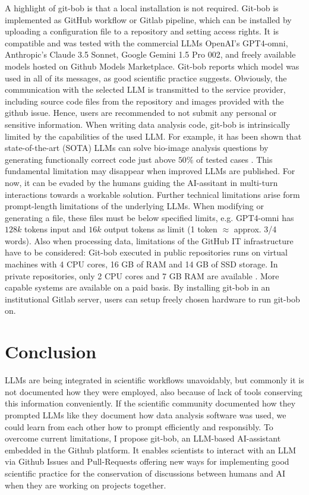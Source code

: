 \documentclass[times, twoside]{zHenriquesLab-StyleBioRxiv}
\begin{document}
A highlight of git-bob is that a local installation is not required. Git-bob is implemented as GitHub workflow or Gitlab pipeline, which can be installed by uploading a configuration file to a repository and setting access rights. It is compatible and was tested with the commercial LLMs OpenAI's GPT4-omni, Anthropic's Claude 3.5 Sonnet, Google Gemini 1.5 Pro 002, and freely available models hosted on Github Models Marketplace. Git-bob reports which model was used in all of its messages, as good scientific practice suggests. Obviously, the communication with the selected LLM is transmitted to the service provider, including source code files from the repository and images provided with the github issue. Hence, users are recommended to not submit any personal or sensitive information. When writing data analysis code, git-bob is intrinsically limited by the capabilities of the used LLM. For example, it has been shown that state-of-the-art (SOTA) LLMs can solve bio-image analysis questions by generating functionally correct code just above $50\%$ of tested cases \cite{benchmark_llm_bia}. This fundamental limitation may disappear when improved LLMs are published. For now, it can be evaded by the humans guiding the AI-assitant in multi-turn interactions towards a workable solution. Further technical limitations arise form prompt-length limitations of the underlying LLMs. When modifying or generating a file, these files must be below specified limits, e.g. GPT4-omni has $128k$ tokens input and $16k$ output tokens as limit (1 token $\approx$ approx. 3/4 words). Also when processing data, limitations of the GitHub IT infrastructure have to be considered: Git-bob executed in public repositories runs on virtual machines with 4 CPU cores, 16 GB of RAM and 14 GB of SSD storage. In private repositories, only 2 CPU cores and 7 GB RAM are available \cite{github_actions_runners_2024}. More capable systems are available on a paid basis. By installing git-bob in an institutional Gitlab server, users can setup freely chosen hardware to run git-bob on.


\section*{Conclusion}

LLMs are being integrated in scientific workflows unavoidably, but commonly it is not documented how they were employed, also because of lack of tools conserving this information conveniently. If the scientific community documented how they prompted LLMs like they document how data analysis software was used, we could learn from each other how to prompt efficiently and responsibly. To overcome current limitations, I propose git-bob, an LLM-based AI-assistant embedded in the Github platform. It enables scientists to interact with an LLM via Github Issues and Pull-Requests offering new ways for implementing good scientific practice for the conservation of discussions between humans and AI when they are working on projects together.
\end{document}
